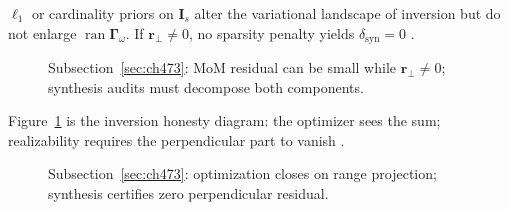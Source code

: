 \begin{lemma}
\label{lem:ch4.sparsity-obstruction}
\(\ell_{1}\) or cardinality priors on \(\mathbf{I}_{s}\) alter the variational landscape of inversion but do not enlarge
\(\operatorname{ran}\boldsymbol{\Gamma}_\omega\). If \(\mathbf{r}_{\perp}\neq0\), no sparsity penalty yields \(\delta_{\mathrm{syn}}=0\)
\cite{harrington2001,devaney2004,stratton1941,hansen1988}.
\end{lemma}

\begin{figure}[t]
\centering
{}
\caption{Subsection~\ref{sec:ch473}: MoM residual can be small while \(\mathbf{r}_{\perp}\neq0\); synthesis audits must decompose both components.}
\label{fig:ch4.inversion-residual-split}
\end{figure}

Figure~\ref{fig:ch4.inversion-residual-split} is the inversion honesty diagram: the optimizer sees the sum; realizability requires the perpendicular
part to vanish \cite{stratton1941,harrington2001,devaney2004}.

\begin{figure}[t]
\centering
{}
\caption{Subsection~\ref{sec:ch473}: optimization closes on range projection; synthesis certifies zero perpendicular residual.}
\label{fig:ch4.synthesis-certificate-chain}
\end{figure}

